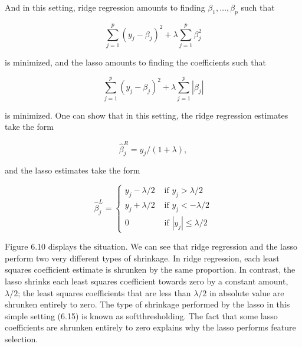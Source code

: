 \documentclass[10pt]{article}
\begin{document}
And in this setting, ridge regression amounts to finding $\beta_{1}, \ldots, \beta_{p}$ such that


\begin{equation*}
\sum_{j=1}^{p}\left(y_{j}-\beta_{j}\right)^{2}+\lambda \sum_{j=1}^{p} \beta_{j}^{2} \tag{6.12}
\end{equation*}


is minimized, and the lasso amounts to finding the coefficients such that


\begin{equation*}
\sum_{j=1}^{p}\left(y_{j}-\beta_{j}\right)^{2}+\lambda \sum_{j=1}^{p}\left|\beta_{j}\right| \tag{6.13}
\end{equation*}


is minimized. One can show that in this setting, the ridge regression estimates take the form


\begin{equation*}
\hat{\beta}_{j}^{R}=y_{j} /(1+\lambda), \tag{6.14}
\end{equation*}


and the lasso estimates take the form

\[
\hat{\beta}_{j}^{L}= \begin{cases}y_{j}-\lambda / 2 & \text { if } y_{j}>\lambda / 2  \tag{6.15}\\ y_{j}+\lambda / 2 & \text { if } y_{j}<-\lambda / 2 \\ 0 & \text { if }\left|y_{j}\right| \leq \lambda / 2\end{cases}
\]

Figure 6.10 displays the situation. We can see that ridge regression and the lasso perform two very different types of shrinkage. In ridge regression, each least squares coefficient estimate is shrunken by the same proportion. In contrast, the lasso shrinks each least squares coefficient towards zero by a constant amount, $\lambda / 2$; the least squares coefficients that are less than $\lambda / 2$ in absolute value are shrunken entirely to zero. The type of shrinkage performed by the lasso in this simple setting (6.15) is known as softthresholding. The fact that some lasso coefficients are shrunken entirely to zero explains why the lasso performs feature selection.
\end{document}
